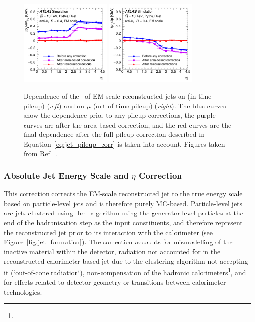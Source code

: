 \begin{figure}[!htb]
    \begin{center}
        \includegraphics[width=0.4\textwidth]{figures/chapter3/jets/jet_pileup_corr_alpha}
        \includegraphics[width=0.4\textwidth]{figures/chapter3/jets/jet_pileup_corr_beta}
        \caption{
            Dependence of the \pT~of EM-scale reconstructed jets on \npv (in-time pileup) (\textit{left}) and on
            $\mu$ (out-of-time pileup) (\textit{right}).
            The blue curves show the dependence prior to any pileup corrections,
            the purple curves are after the area-based correction,
            and the red curves are the final dependence after the full pileup correction described in Equation~\ref{eq:jet_pileup_corr}
            is taken into account.
            Figures taken from Ref.~\cite{Aaboud:2017jcu}.
        }
        \label{fig:jet_pileup_corr}
    \end{center}
\end{figure}

\subsubsection{Absolute Jet Energy Scale and $\eta$ Correction}
\label{sec:jet_eta_corr}

This correction corrects the EM-scale reconstructed jet to the true energy scale based on particle-level
jets and is therefore purely MC-based.
Particle-level jets are jets clustered using the \antikt~algorithm using the generator-level
particles at the end of the hadronisation step as the input constituents, and therefore represent the reconstructed jet prior to
its interaction with the calorimeter (see Figure~\ref{fig:jet_formation}).
The correction accounts for mismodelling of the inactive material within the detector, radiation not accounted for
in the reconstructed calorimeter-based jet due to the clustering algorithm not accepting it (`out-of-cone radiation`),
non-compensation of the hadronic calorimeters\footnote{ {\color{red}{Compensating...}}}, and for effects
related to detector geometry or transitions between calorimeter technologies.

